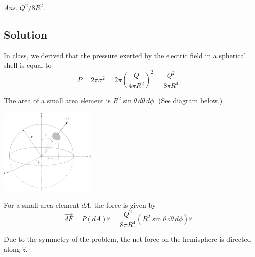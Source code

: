 \documentclass[solutions]{esg8022pset}
\begin{document}
  \begin{flushright}\emph{Ans}. $Q^2/8R^2$.\end{flushright}
\subsection{Solution}

  In class, we derived that the pressure exerted by the electric field
  in a spherical shell is equal to
  $$P = 2\pi \sigma^2 = 2\pi \left(\frac{Q}{4\pi R^2}\right)^2 = \frac{Q^2}{8\pi R^4}.$$

  The area of a small area element is $R^2\sin\theta\,d\theta\,d\phi$.  (See diagram below.)
  \begin{center}\includegraphics[width=0.35\textwidth]{ps02_sol_03}\end{center}

  For a small area element $dA$, the force is given by
  $$\vec{dF} = P(dA)\hat r = \frac{Q^2}{8\pi R^4}(R^2\sin\theta\,d\theta\,d\phi)\hat r.$$

  Due to the symmetry of the problem, the net force on the hemisphere
  is directed along $\hat z$.
\end{document}
